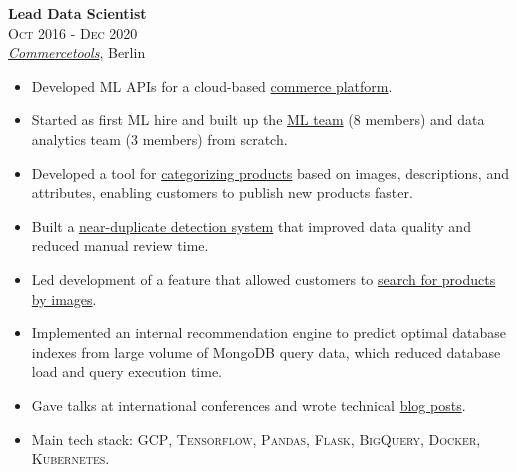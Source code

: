 \documentclass[a4paper,9.5pt]{article}
\begin{document}
\begin{minipage}[t]{0.65\textwidth}
\textbf{Lead Data Scientist}\\
\textsc{Oct 2016 - Dec 2020}\\
\emph{\href{https://commercetools.com/}{Commercetools}}, Berlin
\vspace{1mm}
\begin{itemize}[leftmargin=1em, itemsep=1mm, parsep=0.5mm]
  \item Developed ML APIs for a cloud-based \href{https://docs.commercetools.com}{commerce platform}.
  \item Started as first ML hire and built up the \href{https://techblog.commercetools.com/building-up-a-data-science-team-from-scratch-7a7b24ba9f2d}{ML team} (8 members) and data analytics team (3 members) from scratch.
  \item Developed a tool for \href{https://techblog.commercetools.com/boosting-product-categorization-with-machine-learning-ad4dbd30b0e8}{categorizing products} based on images, descriptions, and attributes, enabling customers to publish new products faster.
  \item Built a \href{https://medium.com/@Evi.lazaridou/improving-data-quality-with-product-similarity-search-d037c7212071}{near-duplicate detection system} that improved data quality and reduced manual review time.
  \item Led development of a feature that allowed customers to \href{https://medium.com/@mnalavadi/reverse-image-search-with-machine-learning-92786a07c142}{search for products by images}.
  \item Implemented an internal recommendation engine to predict optimal database indexes from large volume of MongoDB query data, which reduced database load and query execution time.
  \item Gave talks at international conferences and wrote technical \href{https://medium.com/@amadeus.magrabi}{blog posts}.
  \item Main tech stack: \textsc{GCP}, \textsc{Tensorflow}, \textsc{Pandas}, \textsc{Flask}, \textsc{BigQuery}, \textsc{Docker}, \textsc{Kubernetes}.
\end{itemize}
\vspace{2mm}


\end{minipage}
\end{document}
